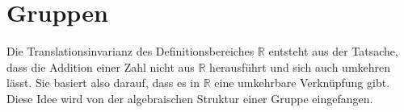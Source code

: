 %
%
%
\section{Gruppen
\label{buch:gruppen:section:gruppe}}
Die Translationsinvarianz des Definitionsbereiches $\mathbb{R}$
entsteht aus der Tatsache, dass die Addition einer Zahl
nicht aus $\mathbb{R}$ herausführt und sich auch umkehren lässt.
Sie basiert also darauf, dass es in $\mathbb{R}$ eine umkehrbare
Verknüpfung gibt.
Diese Idee wird von der algebraischen Struktur einer Gruppe eingefangen.






